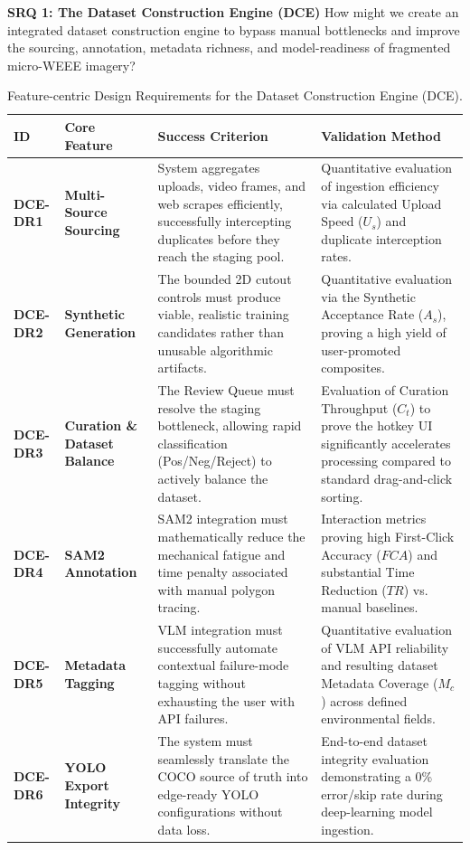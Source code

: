 \textbf{SRQ 1: The Dataset Construction Engine (DCE)} 
How might we create an integrated dataset construction engine to bypass manual bottlenecks and improve the sourcing, annotation, metadata richness, and model-readiness of fragmented micro-WEEE imagery?
\begin{table}[H]
\centering
\scriptsize
\renewcommand{\arraystretch}{1.4}
\begin{tabularx}{\textwidth}{@{} p{} p{} X p{} @{}}
\toprule
\textbf{ID} & \textbf{Core Feature} & \textbf{Success Criterion} & \textbf{Validation Method} \\
\midrule
\textbf{DCE-DR1} & \textbf{Multi-Source Sourcing} & System aggregates uploads, video frames, and web scrapes efficiently, successfully intercepting duplicates before they reach the staging pool. & Quantitative evaluation of ingestion efficiency via calculated Upload Speed ($U_s$) and duplicate interception rates. \\
\addlinespace
\textbf{DCE-DR2} & \textbf{Synthetic Generation} & The bounded 2D cutout controls must produce viable, realistic training candidates rather than unusable algorithmic artifacts. & Quantitative evaluation via the Synthetic Acceptance Rate ($A_s$), proving a high yield of user-promoted composites. \\
\addlinespace
\textbf{DCE-DR3} & \textbf{Curation \& Dataset Balance} & The Review Queue must resolve the staging bottleneck, allowing rapid classification (Pos/Neg/Reject) to actively balance the dataset. & Evaluation of Curation Throughput ($C_t$) to prove the hotkey UI significantly accelerates processing compared to standard drag-and-click sorting. \\
\addlinespace
\textbf{DCE-DR4} & \textbf{SAM2 Annotation} & SAM2 integration must mathematically reduce the mechanical fatigue and time penalty associated with manual polygon tracing. & Interaction metrics proving high First-Click Accuracy ($FCA$) and substantial Time Reduction ($TR$) vs. manual baselines. \\
\addlinespace
\textbf{DCE-DR5} & \textbf{Metadata Tagging} & VLM integration must successfully automate contextual failure-mode tagging without exhausting the user with API failures. & Quantitative evaluation of VLM API reliability and resulting dataset Metadata Coverage ($M_c$) across defined environmental fields. \\
\addlinespace
\textbf{DCE-DR6} & \textbf{YOLO Export Integrity} & The system must seamlessly translate the COCO source of truth into edge-ready YOLO configurations without data loss. & End-to-end dataset integrity evaluation demonstrating a 0\% error/skip rate during deep-learning model ingestion. \\
\bottomrule
\end{tabularx}
\caption{Feature-centric Design Requirements for the Dataset Construction Engine (DCE).}
\label{tab:dr_dce}
\end{table}


